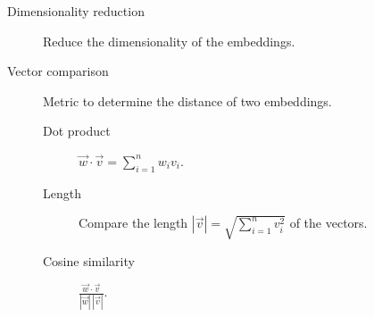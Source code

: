 \begin{description}
    \item[Dimensionality reduction] 
        Reduce the dimensionality of the embeddings.

    \item[Vector comparison] 
        Metric to determine the distance of two embeddings.

        \begin{description}
            \item[Dot product] $\vec{w} \cdot \vec{v} = \sum_{i=1}^{n} w_i v_i$.
            \item[Length] Compare the length $|\vec{v}| = \sqrt{\sum_{i=1}^{n} v_i^2}$ of the vectors.
            \item[Cosine similarity] $\frac{\vec{w} \cdot \vec{v}}{|\vec{w}| \, |\vec{v}|}$.
        \end{description}
\end{description}